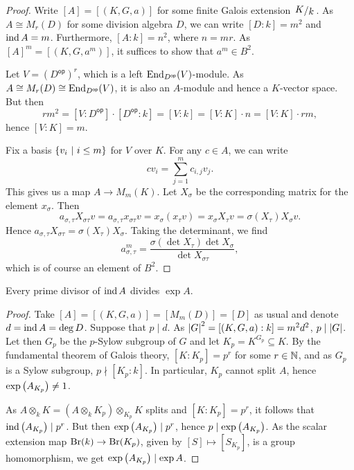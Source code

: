 \begin{proof}
Write $[A] = [(K, G, a)]$ for some finite Galois extension
$\kvoc{K}{k}$. As $A \cong M_r(D)$ for some division algebra $D$,
we can write $[D : k] = m^2$ and $\operatorname{ind} A = m$. Furthermore,
$[A : k] = n^2$, where $n = mr$. As $[A]^m = [(K, G, a^m)]$, it
suffices to show that $a^m \in B^2$.

Let $V = (D^{\mathsf{op}})^r$, which is a left
$\operatorname{End}_{D^{\mathsf{op}}}(V)$-module. As
$A \cong M_r(D) \cong \operatorname{End}_{D^{\mathsf{op}}}(V)$, it is also an
$A$-module and hence a $K$-vector space. But then
\[
r m^2 =
[V : D^{\mathsf{op}}] \cdot [D^{\mathsf{op}} : k] =
[V : k] =
[V : K] \cdot n =
[V : K] \cdot rm,
\]
hence $[V : K] = m$.

Fix a basis $\left\{v_i~\middle\vert~i \leq m\right\}$ for $V$ over $K$. For any
$c \in A$, we can write
\[
c v_i = \sum_{j=1}^m c_{i,j} v_j.
\]
This gives us a map $A \to M_m(K)$. Let $X_\sigma$ be the
corresponding matrix for the element $x_\sigma$. Then
\[
a_{\sigma, \tau} X_{\sigma \tau} v =
a_{\sigma, \tau} x_{\sigma \tau} v =
x_\sigma (x_\tau v) =
x_\sigma X_\tau v =
\sigma(X_\tau) X_\sigma v.
\]
Hence
$a_{\sigma, \tau} X_{\sigma \tau} = \sigma(X_{\tau}) X_\sigma$.
Taking the determinant, we find
\[
a_{\sigma, \tau}^m =
\frac{\sigma(\det X_\tau) \det X_\sigma}{\det X_{\sigma \tau}},
\]
which is of course an element of $B^2$.
\end{proof}


\begin{trditev}
Every prime divisor of $\operatorname{ind} A$ divides $\exp A$.
\end{trditev}

\begin{proof}
Take $[A] = [(K, G, a)] = [M_m(D)] = [D]$ as usual and denote
$d = \operatorname{ind} A = \deg D$. Suppose that $p \mid d$. As
$\left\lvert G\right\rvert^2 = [(K, G, a) : k] = m^2 d^2$, $p \mid \left\lvert G\right\rvert$. Let then
$G_p$ be the $p$-Sylow subgroup of $G$ and let
$K_p = K^{G_p} \subseteq K$. By the fundamental theorem of Galois
theory, $[K : K_p] = p^r$ for some $r \in \mathbb{N}$, and as $G_p$ is
a Sylow subgroup, $p \nmid [K_p : k]$. In particular, $K_p$ cannot
split $A$, hence $\exp \left(A_{K_p}\right) \ne 1$.

As $A \otimes_k K = (A \otimes_k K_p) \otimes_{K_p} K$ splits and
$[K : K_p] = p^r$, it follows that $\operatorname{ind} \left(A_{K_p}\right) \mid p^r$.
But then $\exp \left(A_{K_p}\right) \mid p^r$, hence
$p \mid \exp \left(A_{K_p}\right)$. As the scalar extension map
$\operatorname{Br}(k) \to \operatorname{Br}(K_p)$, given by $[S] \mapsto [S_{K_p}]$, is a
group homomorphism, we get $\exp \left(A_{K_p}\right) \mid \exp A$.
\end{proof}


